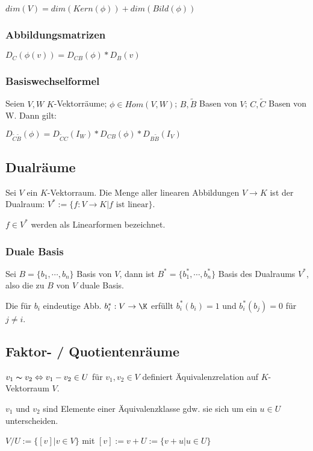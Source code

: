 $dim(V) = dim(Kern(\phi)) + dim(Bild(\phi))$

\subsubsection*{Abbildungsmatrizen}

$D_C(\phi(v)) = D_{CB}(\phi) * D_B(v)$

\subsubsection*{Basiswechselformel}

Seien $V, W$ $K$-Vektorräume; $\phi \in Hom(V, W)$; $B, \tilde B$ Basen von $V$; $C, \tilde C$ Basen von W. Dann gilt:

$D_{\tilde C \tilde B}(\phi) = D_{\tilde C C}(I_W) * D_{CB}(\phi) * D_{B\tilde B}(I_V)$

\subsection*{Dualräume}

Sei $V$ ein $K$-Vektorraum. Die Menge aller linearen Abbildungen $V \rightarrow K$ ist der Dualraum: $V^* := \{f: V \rightarrow K | f \text{ ist linear}\}$.

$f \in V^*$ werden als Linearformen bezeichnet.

\subsubsection*{Duale Basis}

Sei $B = \{b_1, \cdots, b_n\}$ Basis von $V$, dann ist $B^* = \{b_1^*, \cdots, b_n^*\}$ Basis des Dualraums $V^*$, also die zu $B$ von $V$ duale Basis.

Die für $b_i$ eindeutige Abb. $b_i^* : V \rightarrow \K$ erfüllt $b_i^*(b_i) = 1$ und $b_i^*(b_j) = 0$ für $j\neq i$.

\subsection*{Faktor- / Quotientenräume}

$v_1 \thicksim v_2 \Leftrightarrow v_1 - v_2 \in U$ für $v_1, v_2 \in V$ definiert Äquivalenzrelation auf $K$-Vektorraum $V$.

$v_1$ und $v_2$ sind Elemente einer Äquivalenzklasse gdw. sie sich um ein $u \in U$ unterscheiden.

$V/U := \{[v] | v \in V\}$ mit $[v] := v+U := \{v+u|u \in U\}$


